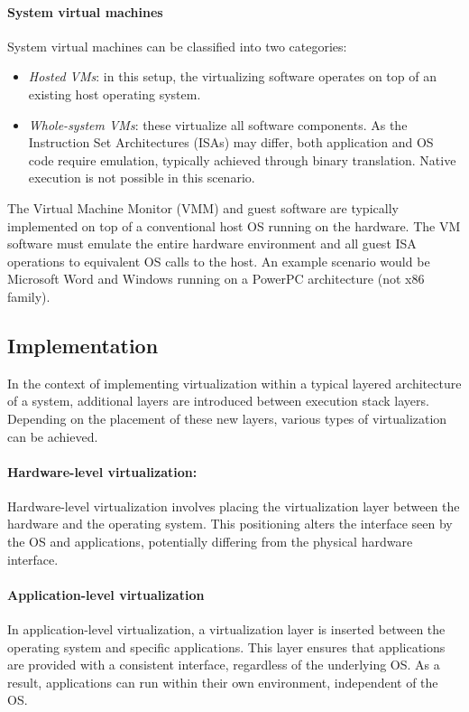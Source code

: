 \paragraph*{System virtual machines}
System virtual machines can be classified into two categories:
\begin{itemize}
    \item \textit{Hosted VMs}: in this setup, the virtualizing software operates on top of an existing host operating system.
    \item \textit{Whole-system VMs}: these virtualize all software components. As the Instruction Set Architectures (ISAs) may differ, both application and OS code require emulation, typically achieved through binary translation. 
        Native execution is not possible in this scenario.
\end{itemize}
The Virtual Machine Monitor (VMM) and guest software are typically implemented on top of a conventional host OS running on the hardware.
The VM software must emulate the entire hardware environment and all guest ISA operations to equivalent OS calls to the host.
An example scenario would be Microsoft Word and Windows running on a PowerPC architecture (not x86 family).

\subsection{Implementation}
In the context of implementing virtualization within a typical layered architecture of a system, additional layers are introduced between execution stack layers. 
Depending on the placement of these new layers, various types of virtualization can be achieved.

\paragraph*{Hardware-level virtualization:}
Hardware-level virtualization involves placing the virtualization layer between the hardware and the operating system. 
This positioning alters the interface seen by the OS and applications, potentially differing from the physical hardware interface.

\paragraph*{Application-level virtualization}
In application-level virtualization, a virtualization layer is inserted between the operating system and specific applications.
This layer ensures that applications are provided with a consistent interface, regardless of the underlying OS. 
As a result, applications can run within their own environment, independent of the OS.

